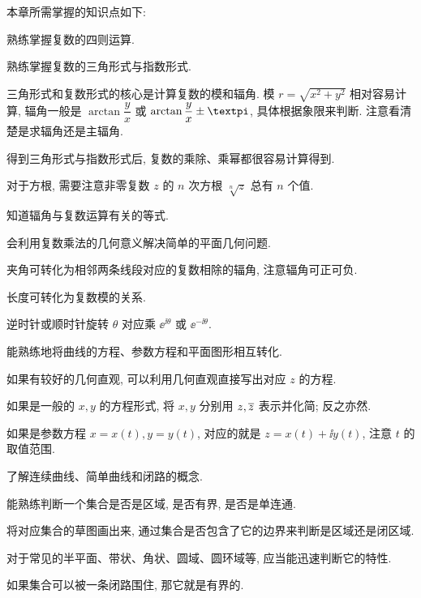本章所需掌握的知识点如下:
\begin{conclusion}
  \item 熟练掌握复数的四则运算.
  \item 熟练掌握复数的三角形式与指数形式.
  \begin{conclusion}
    \item 三角形式和复数形式的核心是计算复数的模和辐角.
    模 $r=\sqrt{x^2+y^2}$ 相对容易计算, 辐角一般是 $\arctan \dfrac yx$ 或 $\arctan \dfrac yx\pm\cpi$, 具体根据象限来判断.
    注意看清楚是求辐角还是主辐角.
    \item 得到三角形式与指数形式后, 复数的乘除、乘幂都很容易计算得到.
    \item 对于方根, 需要注意非零复数 $z$ 的 $n$ 次方根 $\sqrt[n]{z}$ 总有 $n$ 个值.
    \item 知道辐角与复数运算有关的等式.
  \end{conclusion}
  \item 会利用复数乘法的几何意义解决简单的平面几何问题.
  \begin{conclusion}
    \item 夹角可转化为相邻两条线段对应的复数相除的辐角, 注意辐角可正可负.
    \item 长度可转化为复数模的关系.
    \item 逆时针或顺时针旋转 $
    \theta$ 对应乘 $\ee^{\ii\theta}$ 或 $\ee^{-\ii\theta}$.
  \end{conclusion}
  \item 能熟练地将曲线的方程、参数方程和平面图形相互转化.
  \begin{conclusion}
    \item 如果有较好的几何直观, 可以利用几何直观直接写出对应 $z$ 的方程.
    \item 如果是一般的 $x,y$ 的方程形式, 将 $x,y$ 分别用 $z,\overline z$ 表示并化简; 反之亦然.
    \item 如果是参数方程 $x=x(t),y=y(t)$, 对应的就是 $z=x(t)+\ii y(t)$, 注意 $t$ 的取值范围.
  \end{conclusion}
  \item 了解连续曲线、简单曲线和闭路的概念.
  \item 能熟练判断一个集合是否是区域, 是否有界, 是否是单连通.
  \begin{conclusion}
    \item 将对应集合的草图画出来, 通过集合是否包含了它的边界来判断是区域还是闭区域.
    \item 对于常见的半平面、带状、角状、圆域、圆环域等, 应当能迅速判断它的特性.
    \item 如果集合可以被一条闭路围住, 那它就是有界的.

\end{conclusion}
\end{conclusion}
